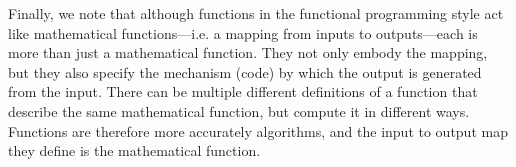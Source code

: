 \begin{gram}
  Finally, we note that although functions in the functional
  programming style act like mathematical functions---i.e. a mapping
  from inputs to outputs---each is more than just a mathematical
  function.  They not only embody the mapping, but they also specify
  the mechanism (code) by which the output is generated from the
  input.  There can be multiple different definitions of a function
  that describe the same mathematical function, but compute it in
  different ways.  Functions are therefore more accurately algorithms,
  and the input to output map they define is the mathematical
  function.
\end{gram}
